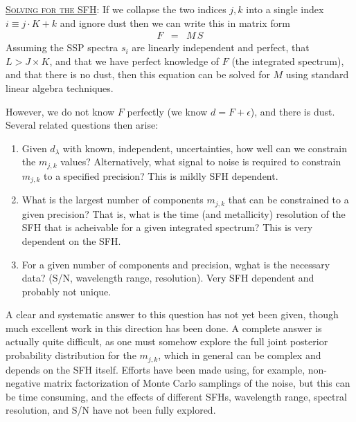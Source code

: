 \documentclass{article}
\begin{document}
\vspace{0.15in}

\underline{\textsc{Solving for the SFH}}:
If we collapse the two indices $j, k$ into a single index $i \equiv j\cdot K + k$ and ignore dust then we can write this in matrix form
\begin{eqnarray}
F & = & M \, S
\end{eqnarray}
Assuming the SSP spectra $s_{i}$ are linearly independent and perfect, that $L > J\times K$, and that we have perfect knowledge of $F$ (the integrated spectrum), and that there is no dust, 
then this equation can be solved for $M$ using standard linear algebra techniques.

However, we do not know $F$ perfectly (we know $d = F + \epsilon$), and there is dust. 
Several related questions then arise:
\begin{enumerate}

\item Given $d_\lambda$ with known, independent, uncertainties, how well can we constrain the $m_{j,k}$ values? 
Alternatively, what signal to noise is required to constrain $m_{j,k}$ to a specified precision?  
This is mildly SFH dependent.

\item What is the largest number of components $m_{j,k}$ that can be constrained to a given precision?
That is, what is the time (and metallicity) resolution of the SFH that is acheivable for a given integrated spectrum?
This is very dependent on the SFH.

\item For a given number of components and precision, wghat is the necessary data? 
(S/N, wavelength range, resolution).
Very SFH dependent and probably not unique.

\end{enumerate}

A clear and systematic answer to this question has not yet been given, though much excellent work in this direction has been done. 
A complete answer is actually quite difficult, as one must somehow explore the full joint posterior probability distribution for the $m_{j,k}$, 
which in general can be complex and depends on the SFH itself.
Efforts have been made using, for example, non-negative matrix factorization of Monte Carlo samplings of the noise, 
but this can be time consuming, and the effects of different SFHs, wavelength range, spectral resolution, and S/N have not been fully explored.

\vspace{0.15in}
\end{document}
